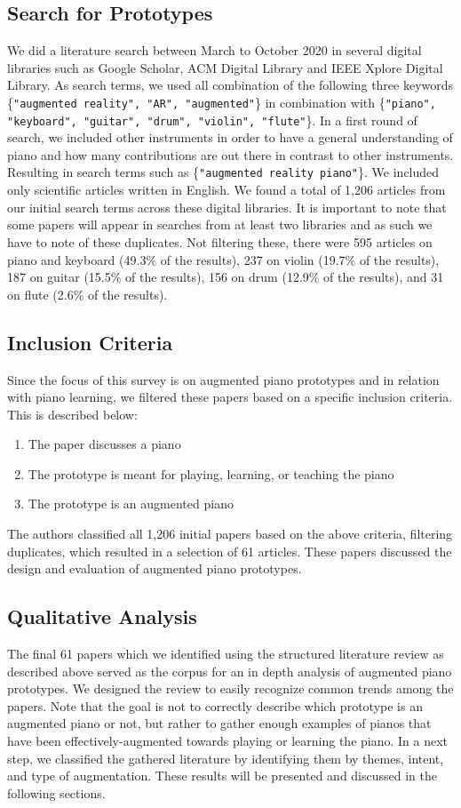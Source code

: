\documentclass[sigconf, screen, review]{acmart}
\begin{document}
\subsection{Search for Prototypes}
We did a literature search between March to October 2020 in several digital libraries such as Google Scholar, ACM Digital Library and IEEE Xplore Digital Library. As search terms, we used all combination of the following three keywords \{\texttt{"augmented reality", "AR", "augmented"}\} in combination with \{\texttt{"piano", "keyboard", "guitar", "drum", "violin", "flute"}\}. In a first round of search, we included other instruments in order to have a general understanding of piano and how many contributions are out there in contrast to other instruments. Resulting in search terms such as \{\texttt{"augmented reality piano"}\}. We included only scientific articles written in English. We found a total of 1,206 articles from our initial search terms across these digital libraries. It is important to note that some papers will appear in searches from at least two libraries and as such we have to note of these duplicates. Not filtering these, there were 595 articles on piano and keyboard (49.3\% of the results), 237 on violin (19.7\% of the results), 187 on guitar (15.5\% of the results), 156 on drum (12.9\% of the results), and 31 on flute (2.6\% of the results). 

\subsection{Inclusion Criteria}
Since the focus of this survey is on augmented piano prototypes and in relation with piano learning, we filtered these papers based on a specific inclusion criteria. This is described below: 
\begin{enumerate}
    \item The paper discusses a piano
    \item The prototype is meant for playing, learning, or teaching the piano
    \item The prototype is an augmented piano 
\end{enumerate}
The authors classified all 1,206 initial papers based on the above criteria, filtering duplicates, which resulted in a selection of 61 articles. These papers discussed the design and evaluation of augmented piano prototypes. 

\subsection{Qualitative Analysis}
The final 61 papers which we identified using the structured literature review as described above served as the corpus for an in depth analysis of augmented piano prototypes. We designed the review to easily recognize common trends among the papers. Note that the goal is not to correctly describe which prototype is an augmented piano or not, but rather to gather enough examples of pianos that have been effectively-augmented towards playing or learning the piano.  In a next step, we classified the gathered literature by identifying them by themes, intent, and type of augmentation. These results will be presented and discussed in the following sections. 
\end{document}
